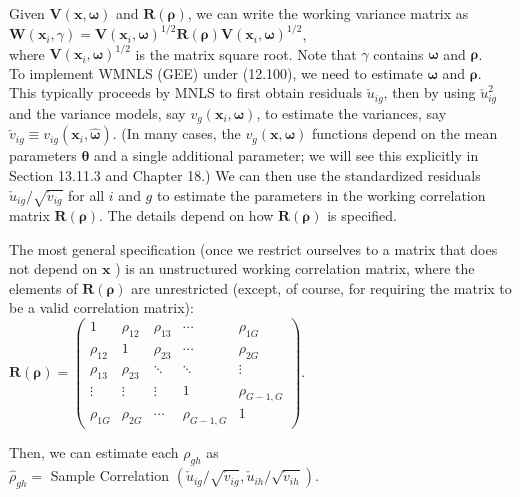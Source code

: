 \documentclass[10pt]{article}
\begin{document}
Given $\mathbf{V}(\mathbf{x}, \boldsymbol{\omega})$ and $\mathbf{R}(\boldsymbol{\rho})$, we can write the working variance matrix as\\
$\mathbf{W}\left(\mathbf{x}_{i}, \gamma\right)=\mathbf{V}\left(\mathbf{x}_{i}, \boldsymbol{\omega}\right)^{1 / 2} \mathbf{R}(\boldsymbol{\rho}) \mathbf{V}\left(\mathbf{x}_{i}, \boldsymbol{\omega}\right)^{1 / 2}$,\\
where $\mathbf{V}\left(\mathbf{x}_{i}, \boldsymbol{\omega}\right)^{1 / 2}$ is the matrix square root. Note that $\gamma$ contains $\boldsymbol{\omega}$ and $\boldsymbol{\rho}$.\\
To implement WMNLS (GEE) under (12.100), we need to estimate $\boldsymbol{\omega}$ and $\boldsymbol{\rho}$. This typically proceeds by MNLS to first obtain residuals $\check{u}_{i g}$, then by using $\check{u}_{i g}^{2}$ and the variance models, say $v_{g}\left(\mathbf{x}_{i}, \boldsymbol{\omega}\right)$, to estimate the variances, say $\check{v}_{i g} \equiv v_{i g}\left(\mathbf{x}_{i}, \hat{\boldsymbol{\omega}}\right)$. (In many cases, the $v_{g}(\mathbf{x}, \boldsymbol{\omega})$ functions depend on the mean parameters $\boldsymbol{\theta}$ and a single additional parameter; we will see this explicitly in Section 13.11.3 and Chapter 18.) We can then use the standardized residuals $\check{u}_{i g} / \sqrt{\check{v}_{i g}}$ for all $i$ and $g$ to estimate the parameters in the working correlation matrix $\mathbf{R}(\boldsymbol{\rho})$. The details depend on how $\mathbf{R}(\boldsymbol{\rho})$ is specified.

The most general specification (once we restrict ourselves to a matrix that does not depend on $\mathbf{x}$ ) is an unstructured working correlation matrix, where the elements of $\mathbf{R}(\boldsymbol{\rho})$ are unrestricted (except, of course, for requiring the matrix to be a valid correlation matrix):\\
$\mathbf{R}(\boldsymbol{\rho})=\left(\begin{array}{ccccc}1 & \rho_{12} & \rho_{13} & \cdots & \rho_{1 G} \\ \rho_{12} & 1 & \rho_{23} & \cdots & \rho_{2 G} \\ \rho_{13} & \rho_{23} & \ddots & \ddots & \vdots \\ \vdots & \vdots & \vdots & 1 & \rho_{G-1, G} \\ \rho_{1 G} & \rho_{2 G} & \cdots & \rho_{G-1, G} & 1\end{array}\right)$.

Then, we can estimate each $\rho_{g h}$ as\\
$\hat{\rho}_{g h}=$ Sample Correlation $\left(\check{u}_{i g} / \sqrt{\check{v}_{i g}}, \check{u}_{i h} / \sqrt{\check{v}_{i h}}\right)$.
\end{document}
